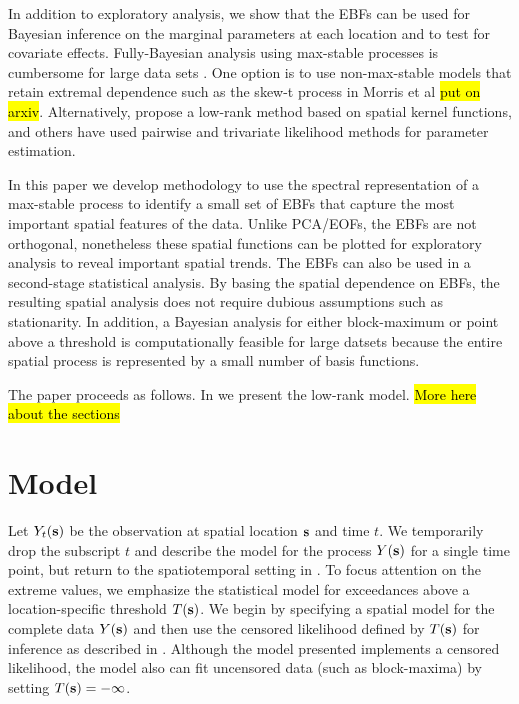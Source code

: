 \documentclass[11pt]{article}
\begin{document}
In addition to exploratory analysis, we show that the EBFs can be used for Bayesian inference on the marginal parameters at each location and to test for covariate effects.
Fully-Bayesian analysis using max-stable processes is cumbersome for large data sets \citep{Wadsworth2014,Thibaud2013a}.
One option is to use non-max-stable models that retain extremal dependence such as the skew-t process in Morris et al \hl{put on arxiv}.
Alternatively, \citet{Reich2012} propose a low-rank method based on spatial kernel functions, and others have used pairwise \citep{Padoan2010,Huser2014} and trivariate \citep{Genton2011} likelihood methods for parameter estimation.

In this paper we develop methodology to use the spectral representation of a max-stable process to identify a small set of EBFs that capture the most important spatial features of the data.
Unlike PCA/EOFs, the EBFs are not orthogonal, nonetheless these spatial functions can be plotted for exploratory analysis to reveal important spatial trends.
The EBFs can also be used in a second-stage statistical analysis.
By basing the spatial dependence on EBFs, the resulting spatial analysis does not require dubious assumptions such as stationarity.
In addition, a Bayesian analysis for either block-maximum or point above a threshold is computationally feasible for large datsets because the entire spatial process is represented by a small number of basis functions.

The paper proceeds as follows. In  we present the low-rank model. \hl{More here about the sections}

\section{Model}\label{ebs:model}

Let $Y_{t}(\mbox{\bf s})$ be the observation at spatial location $\mbox{\bf s}$ and time $t$.  We temporarily drop the subscript $t$ and describe the model for the process $Y(\mbox{\bf s})$ for a single time point, but return to the spatiotemporal setting in .
To focus attention on the extreme values, we emphasize the statistical model for exceedances above a location-specific threshold $T(\mbox{\bf s})$.
We begin by specifying a spatial model for the complete data $Y(\mbox{\bf s})$ and then use the censored likelihood defined by $T(\mbox{\bf s})$ for inference as described in .
Although the model presented implements a censored likelihood, the model also can fit uncensored data (such as block-maxima) by setting $T(\mbox{\bf s}) = -\infty$.
\end{document}
